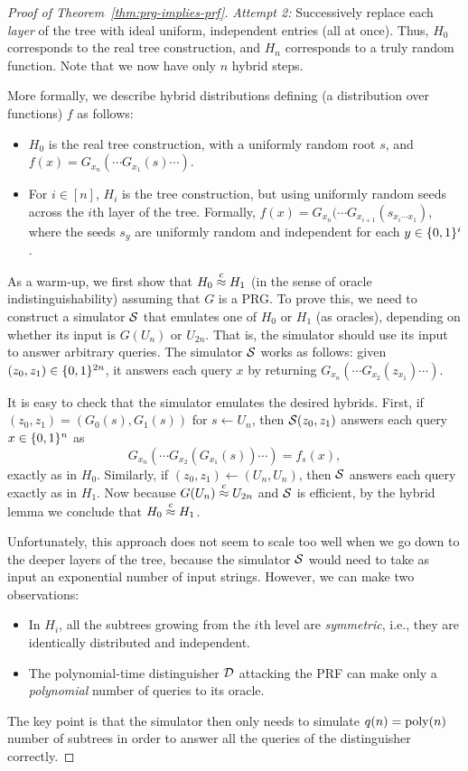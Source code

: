 \documentclass[11pt]{article}
\begin{document}
\begin{proof}[Proof of Theorem~\ref{thm:prg-implies-prf}]
  \emph{Attempt 2:} Successively replace each \emph{layer} of the tree
  with ideal uniform, independent entries (all at once).  Thus,
  $H_{0}$ corresponds to the real tree construction, and $H_{n}$
  corresponds to a truly random function.  Note that we now have only
  $n$ hybrid steps.

  More formally, we describe hybrid distributions defining (a
  distribution over functions) $f$ as follows:
  \begin{itemize}
  \item $H_{0}$ is the real tree construction, with a uniformly random
    root $s$, and $f(x) = G_{x_{n}}(\cdots G_{x_{1}}(s) \cdots)$.
  \item For $i \in [n]$, $H_{i}$ is the tree construction, but using
    uniformly random seeds across the $i$th layer of the tree.
    Formally, $f(x) = G_{x_{n}}(\cdots G_{x_{i+1}}(s_{x_{i}\cdots
      x_{1}})$, where the seeds $s_{y}$ are uniformly random and
    independent for each $y \in \{0,1\}^{i}$.
  \end{itemize}
  
  As a warm-up, we first show that $H_{0} \stackrel{c}{\approx} H_{1}$ (in the
  sense of oracle indistinguishability) assuming that $G$ is a PRG.
  To prove this, we need to construct a simulator $\mathcal{S}$ that emulates
  one of $H_{0}$ or $H_{1}$ (as oracles), depending on whether its
  input is $G(U_{n})$ or $U_{2n}$.  That is, the simulator should use
  its input to answer arbitrary queries.  The simulator $\mathcal{S}$ works
  as follows: given $(z_{0}, z_{1}) \in \{0,1\}^{2n}$, it answers each
  query $x$ by returning $G_{x_{n}}(\cdots G_{x_{2}}(z_{x_{1}})\cdots
  )$.

  It is easy to check that the simulator emulates the desired hybrids.
  First, if $(z_{0}, z_{1}) = (G_{0}(s), G_{1}(s))$ for $s \gets
  U_{n}$, then $\mathcal{S}(z_{0}, z_{1})$ answers each query $x \in
  \{0,1\}^{n}$ as
  \[ G_{x_{n}}(\cdots G_{x_{2}}(G_{x_{1}}(s)) \cdots ) = f_{s}(x), \]
  exactly as in $H_{0}$.  Similarly, if $(z_0, z_1) \gets (U_n,
  U_n)$, then $\mathcal{S}$ answers each query exactly as in $H_{1}$.  Now
  because $G(U_{n}) \stackrel{c}{\approx} U_{2n}$ and $\mathcal{S}$ is efficient, by the
  hybrid lemma we conclude that $H_0 \stackrel{c}{\approx} H_1$.

  Unfortunately, this approach does not seem to scale too well when we
  go down to the deeper layers of the tree, because the simulator
  $\mathcal{S}$ would need to take as input an exponential number of input
  strings.  However, we can make two observations:
  \begin{itemize}
  \item In $H_{i}$, all the subtrees growing from the $i$th level are
    \emph{symmetric}, i.e., they are identically distributed and
    independent.
  \item The polynomial-time distinguisher $\mathcal{D}$ attacking the PRF
    can make only a \emph{polynomial} number of queries to its oracle.
  \end{itemize}
  The key point is that the simulator then only needs to simulate
  $q(n) = \operatorname{poly}(n)$ number of subtrees in order to answer all the
  queries of the distinguisher correctly.


\end{proof}
\end{document}
